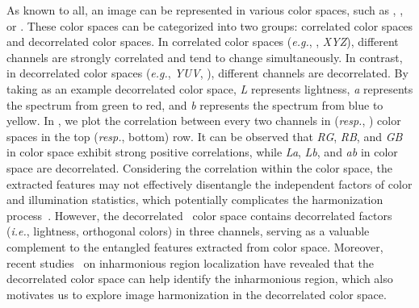 \documentclass[sigconf]{acmart}
\begin{document}
As known to all, an image can be represented in various color spaces, such as , , or . 
These color spaces can be categorized into two groups: correlated color spaces and decorrelated color spaces. 
In correlated color spaces (\emph{e.g.}, , \textit{XYZ}),  different channels are strongly correlated and tend to change simultaneously. 
In contrast, in decorrelated color spaces (\emph{e.g.}, \textit{YUV}, ), different channels are decorrelated.
By taking  as an example decorrelated color space, \textit{L} represents lightness, \textit{a} represents the spectrum from green to red, and \textit{b} represents the spectrum from blue to yellow. 
In , we plot the correlation between every two channels in  (\emph{resp.}, ) color spaces in the top (\emph{resp.}, bottom) row. It can be observed that  \textit{RG}, \textit{RB}, and \textit{GB} in  color space exhibit strong positive correlations, while \textit{La}, \textit{Lb}, and \textit{ab} in  color space are decorrelated.
Considering the correlation within the  color space, the extracted  features may not effectively disentangle the independent factors of color and illumination statistics, which potentially complicates the harmonization process~\cite{dovenet,issam,rainnet,ssam}. 
However, the decorrelated~ color space contains decorrelated factors (\emph{i.e.}, lightness, orthogonal colors) in three channels, serving as a valuable complement to the entangled features extracted from  color space. 
Moreover, recent studies~\cite{liang2022inharmonious, wu2022inharmonious} on inharmonious region localization have revealed that the decorrelated color space can help identify the inharmonious region, which also motivates us to explore image harmonization in the decorrelated color space. 
\end{document}
